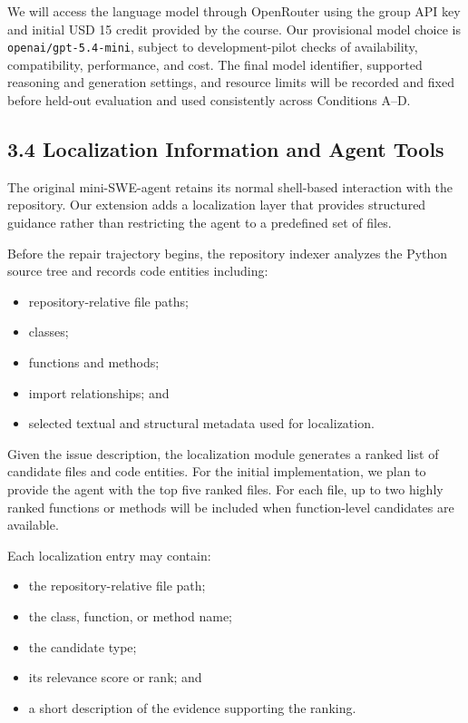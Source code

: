 \documentclass[11pt]{article}
\begin{document}
We will access the language model through OpenRouter using the group
API key and initial USD 15 credit provided by the course. Our
provisional model choice is \texttt{openai/gpt-5.4-mini}, subject to
development-pilot checks of availability, compatibility, performance,
and cost. The final model identifier, supported reasoning and generation
settings, and resource limits will be recorded and fixed before
held-out evaluation and used consistently across Conditions A--D.

\subsection*{3.4 Localization Information and Agent Tools}

The original mini-SWE-agent retains its normal shell-based interaction
with the repository. Our extension adds a localization layer that provides
structured guidance rather than restricting the agent to a predefined set
of files.

Before the repair trajectory begins, the repository indexer analyzes the
Python source tree and records code entities including:

\begin{itemize}[leftmargin=*, itemsep=0.25em]
    \item repository-relative file paths;
    \item classes;
    \item functions and methods;
    \item import relationships; and
    \item selected textual and structural metadata used for localization.
\end{itemize}

Given the issue description, the localization module generates a ranked
list of candidate files and code entities. For the initial implementation,
we plan to provide the agent with the top five ranked files. For each file,
up to two highly ranked functions or methods will be included when
function-level candidates are available.

Each localization entry may contain:

\begin{itemize}[leftmargin=*, itemsep=0.25em]
    \item the repository-relative file path;
    \item the class, function, or method name;
    \item the candidate type;
    \item its relevance score or rank; and
    \item a short description of the evidence supporting the ranking.
\end{itemize}
\end{document}
